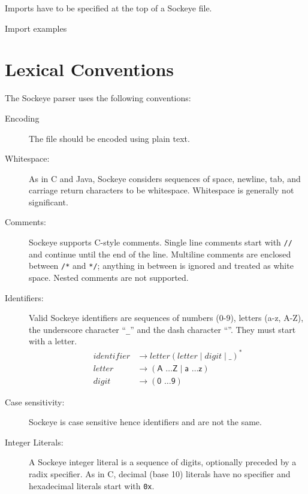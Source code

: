 \documentclass[a4paper,11pt,twoside]{report}
\begin{document}
{{{Imports have to be specified at the top of a Sockeye file.
\begin{example}
Import examples
\end{example}

\chapter{Lexical Conventions}
\label{chap:lexer}

The Sockeye parser uses the following conventions:

\begin{description}
\item[Encoding] The file should be encoded using plain text.
\item[Whitespace:]  As in C and Java, Sockeye considers sequences of
  space, newline, tab, and carriage return characters to be
  whitespace.  Whitespace is generally not significant. 

\item[Comments:] Sockeye supports C-style comments.  Single line comments
  start with \texttt{//} and continue until the end of the line.
  Multiline comments are enclosed between \texttt{/*} and \texttt{*/};
  anything in between is ignored and treated as white space.
  Nested comments are not supported.

\item[Identifiers:] Valid Sockeye identifiers are sequences of numbers
  (0-9), letters (a-z, A-Z), the underscore character ``\texttt{\_}'' and the dash character ``\textendash''. They
  must start with a letter.
  \begin{align*}
  identifier & \rightarrow letter (letter \mid digit \mid \text{\_})^{\textrm{*}} \\
  letter & \rightarrow (\textsf{A \ldots Z} \mid  \textsf{a \ldots z})\\
  digit & \rightarrow (\textsf{0 \ldots 9})
    \end{align*}

\item[Case sensitivity:] Sockeye is case sensitive hence identifiers  and  are not the same.
  
\item[Integer Literals:] A Sockeye integer literal is a sequence of
  digits, optionally preceded by a radix specifier.  As in C, decimal (base 10)
  literals have no specifier and hexadecimal literals start with
  \texttt{0x}.


\end{description}}}}
\end{document}
